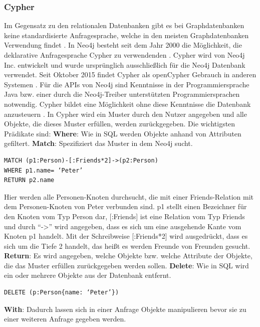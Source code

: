 \subsubsection{Cypher}
Im Gegensatz zu den relationalen Datenbanken gibt es bei Graphdatenbanken keine standardisierte Anfragesprache, welche in den meisten Graphdatenbanken Verwendung findet \parencite{han2011survey}. In Neo4j besteht seit dem Jahr 2000 die Möglichkeit, die deklarative Anfragesprache Cypher zu verwendenden  \parencite{francis2018cypher}. Cypher wird von Neo4j Inc. entwickelt und wurde ursprünglich ausschließlich für die Neo4j Datenbank verwendet. Seit Oktober 2015  findet Cypher als openCypher Gebrauch in anderen Systemen \parencite{francis2018cypher}. Für die APIs von Neo4j sind Kenntnisse in der Programmiersprache Java bzw. einer durch die Neo4j-Treiber unterstützten Programmiersprachen notwendig. Cypher bildet eine Möglichkeit ohne diese Kenntnisse die  Datenbank anzusteuern \parencite{vukotic2015neo4j}. In Cypher wird ein Muster durch den Nutzer angegeben und alle Objekte, die dieses Muster erfüllen, werden zurückgegeben. Die wichtigsten  Prädikate sind: \newline
\textbf{Where}: Wie in SQL werden Objekte anhand von Attributen gefiltert. \newline
\textbf{Match}: Spezifiziert das Muster in dem Neo4j sucht.
\begin{Verbatim}[frame=single]
MATCH (p1:Person)-[:Friends*2]->(p2:Person) 
WHERE p1.name= ‘Peter’ 
RETURN p2.name
\end{Verbatim}
Hier werden alle Personen-Knoten durchsucht, die mit einer Friends-Relation mit dem Personen-Knoten von Peter verbunden sind. p1 stellt einen Bezeichner für den Knoten vom Typ Person dar, [:Friends] ist eine Relation vom Typ Friends und durch “->” wird angegeben, dass es sich um eine ausgehende Kante vom Knoten p1 handelt. Mit der Schreibweise [:Friends*2] wird ausgedrückt, dass es sich um die Tiefe 2 handelt, das heißt es werden Freunde von Freunden gesucht. \newline
\textbf{Return}: Es wird angegeben, welche Objekte bzw. welche Attribute der Objekte, die das Muster erfüllen zurückgegeben werden sollen.\newline
\textbf{Delete}: Wie in SQL  wird ein  oder mehrere Objekte aus der Datenbank entfernt.
\begin{Verbatim}[frame=single]
DELETE (p:Person{name: ‘Peter’})  
\end{Verbatim}
\textbf{With}: Dadurch lassen sich in einer Anfrage Objekte manipulieren bevor sie zu einer weiteren Anfrage gegeben werden. 
